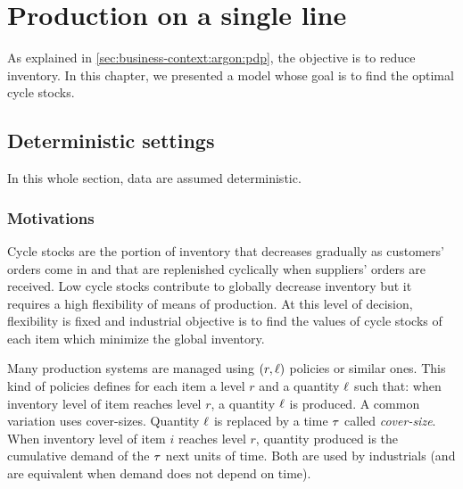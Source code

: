 \chapter{Production on a single line}
\label{chap:lot-size:single-line}






As explained in \cref{sec:business-context:argon:pdp}, the objective is to reduce inventory.
In this chapter, we presented a model whose goal is to find the optimal cycle stocks.


\section{Deterministic settings}

In this whole section, data are assumed deterministic.


\subsection{Motivations}
\label{sec:lot-size:single-line:motivations}


Cycle stocks are the portion of inventory that decreases gradually as customers’ orders come in and that are replenished cyclically when suppliers’ orders are received.
Low cycle stocks contribute to globally decrease inventory but it requires a high flexibility of means of production.
At this level of decision, flexibility is fixed and industrial objective is to find the values of cycle stocks of each item which minimize the global inventory.


Many production systems are managed using $(r,\ell)$ policies or similar ones.
This kind of policies defines for each item a level $r$ and a quantity $\ell$ such that: when inventory level of item reaches level $r$, a quantity $\ell$ is produced.
A common variation uses cover-sizes.
Quantity $\ell$ is replaced by a time $\tau$ called \emph{cover-size}.
When inventory level of item $i$ reaches level $r$, quantity produced is the cumulative demand of the $\tau$ next units of time.
Both are used by industrials (and are equivalent when demand does not depend on time).


